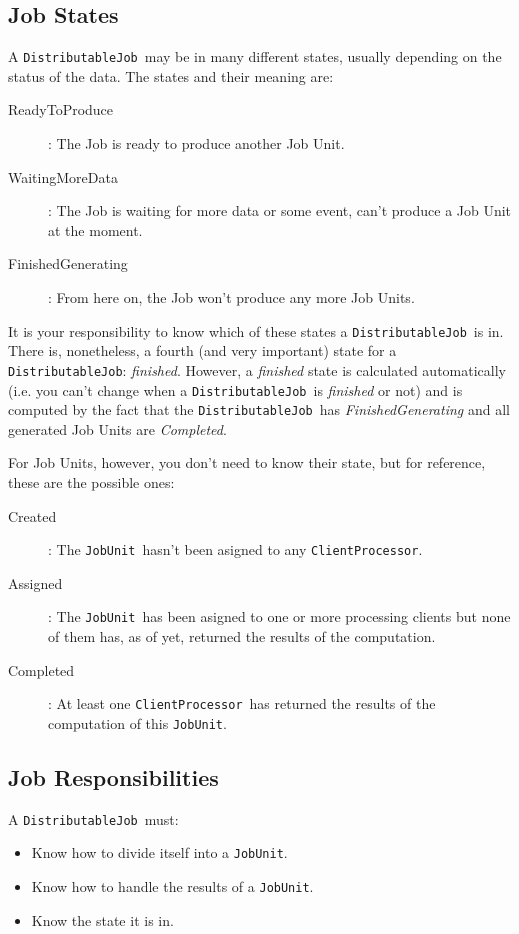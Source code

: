 \documentclass[a4paper,12pt,english]{article}
\renewcommand{\DJ}{\texttt{DistributableJob}}
\newcommand{\JU}{\texttt{JobUnit}}
\newcommand{\CP}{\texttt{ClientProcessor}}
\begin{document}
\subsection{Job States}

A \DJ \ may be in many different states, usually depending on the status of the data. The states and their meaning are:
\begin{description}
\item[ReadyToProduce]: The Job is ready to produce another Job Unit.
\item[WaitingMoreData]: The Job is waiting for more data or some event, can't produce a Job Unit at the moment.
\item[FinishedGenerating]: From here on, the Job won't produce any more Job Units.
\end{description}

It is your responsibility to know which of these states a \DJ \ is in. There is, nonetheless, a fourth (and very important) state for a \DJ: \emph{finished}. However, a \emph{finished} state is calculated automatically (i.e. you can't change when a \DJ \ is \emph{finished} or not) and is computed by the fact that the \DJ \ has \emph{FinishedGenerating} and all generated Job Units are \emph{Completed}. 

For Job Units, however, you don't need to know their state, but for reference, these are the possible ones:
\begin{description}
\item[Created]: The \JU \ hasn't been asigned to any \CP.
\item[Assigned]: The \JU \ has been asigned to one or more processing clients but none of them has, as of yet, returned the results of the computation.
\item[Completed]: At least one \CP \ has returned the results of the computation of this \JU.
\end{description}


\subsection{Job Responsibilities}

A \DJ \ must:
\begin{itemize}
 \item Know how to divide itself into a \JU.
 \item Know how to handle the results of a \JU.
 \item Know the state it is in.
\end{itemize}
\end{document}
